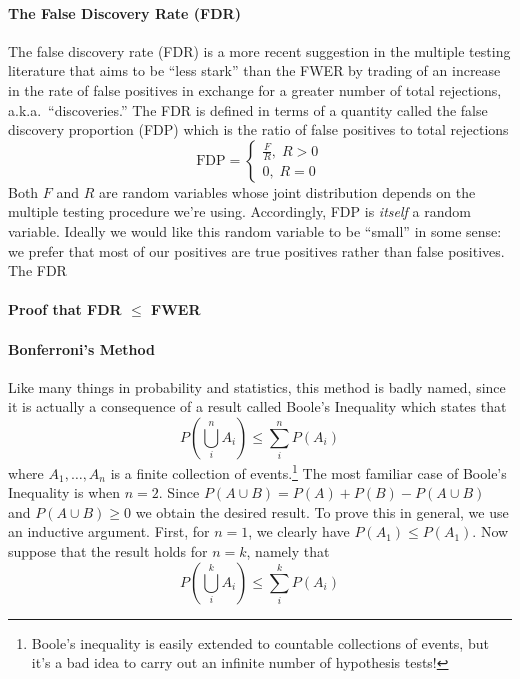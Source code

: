 \paragraph{The False Discovery Rate (FDR)}
The false discovery rate (FDR) is a more recent suggestion in the multiple testing literature that aims to be ``less stark'' than the FWER by trading of an increase in the rate of false positives in exchange for a greater number of total rejections, a.k.a.\ ``discoveries.''
The FDR is defined in terms of a quantity called the false discovery proportion (FDP) which is the ratio of false positives to total rejections
\begin{equation*}
  \mbox{FDP} = \left\{ \begin{array}{c}
    \displaystyle\frac{F}{R}, \; R > 0 \\
    0, \; R = 0
  \end{array}\right.
\end{equation*}
Both $F$ and $R$ are random variables whose joint distribution depends on the multiple testing procedure we're using.
Accordingly, FDP is \emph{itself} a random variable.
Ideally we would like this random variable to be ``small'' in some sense: we prefer that most of our positives are true positives rather than false positives.
The FDR 

\paragraph{Proof that FDR $\leq$ FWER}


\paragraph{Bonferroni's Method}
Like many things in probability and statistics, this method is badly named, since it is actually a consequence of a result called Boole's Inequality which states that
\begin{equation*}
  P\left( \bigcup_{i}^{n} A_i \right) \leq \sum_{i}^{n} P\left( A_{i} \right)
\end{equation*}
where $A_1, \hdots, A_n$ is a finite collection of events.\footnote{Boole's inequality is easily extended to countable collections of events, but it's a bad idea to carry out an infinite number of hypothesis tests!}
The most familiar case of Boole's Inequality is when $n=2$.
Since $P(A\cup B) = P(A) + P(B) - P(A\cup B)$ and $P(A\cup B)\geq 0$ we obtain the desired result.
To prove this in general, we use an inductive argument.
First, for $n=1$, we clearly have $P(A_1)\leq P(A_1)$.
Now suppose that the result holds for $n=k$, namely that
\begin{equation*}
  P\left( \bigcup_{i}^{k} A_i \right) \leq \sum_{i}^{k} P\left( A_{i} \right)
\end{equation*}


